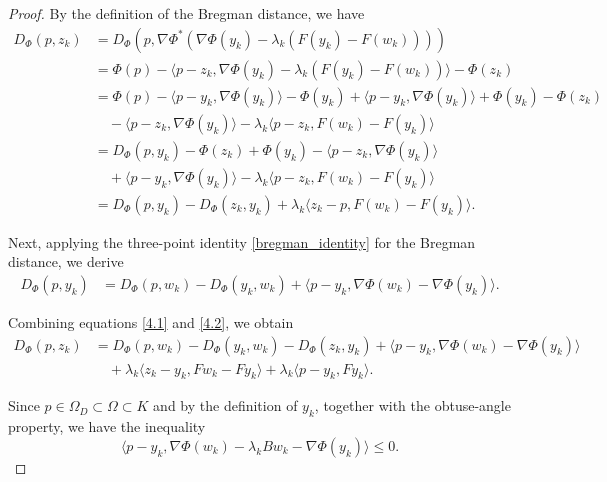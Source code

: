 \documentclass[hidelinks,11 pt]{article}
\numberwithin{equation}{section}
\theoremstyle{definition}  %
\numberwithin{equation}{section}
\numberwithin{theorem}{section}
\begin{document}
\begin{proof}
By the definition of the Bregman distance, we have
\begin{align*}
    D_{\Phi}(p, z_k) 
    &= D_{\Phi}\left(p, \nabla \Phi^*\left(\nabla \Phi(y_k) - \lambda_k (F(y_k) - F( w_k))\right)\right) \\
    &= \Phi(p) - \langle p - z_k, \nabla \Phi(y_k) - \lambda_k (F(y_k) - F(w_k)) \rangle - \Phi(z_k) \\
    &= \Phi(p) - \langle p - y_k, \nabla \Phi(y_k) \rangle - \Phi(y_k) + \langle p - y_k, \nabla \Phi(y_k) \rangle + \Phi(y_k) - \Phi(z_k) \\
    &\quad - \langle p - z_k, \nabla \Phi(y_k) \rangle - \lambda_k \langle p - z_k, F(w_k) - F( y_k) \rangle \\
    &= D_{\Phi}(p, y_k) - \Phi(z_k) + \Phi(y_k) - \langle p - z_k, \nabla \Phi(y_k) \rangle \\
    &\quad + \langle p - y_k, \nabla \Phi(y_k) \rangle - \lambda_k \langle p - z_k, F(w_k) - F( y_k) \rangle \\
    &= D_{\Phi}(p, y_k) - D_{\Phi}(z_k, y_k) + \lambda_k \langle z_k - p, F(w_k) - F(y_k) \rangle. \tag{4.1}\label{4.1}
\end{align*}

Next, applying the three-point identity \eqref{bregman_identity} for the Bregman distance, we derive
\begin{align*}
    D_{\Phi}(p, y_k) 
    &= D_{\Phi}(p, w_k) - D_{\Phi}(y_k, w_k) + \langle p - y_k, \nabla \Phi(w_k) - \nabla \Phi(y_k) \rangle. \tag{4.2}\label{4.2}
\end{align*}

Combining equations \eqref{4.1} and \eqref{4.2}, we obtain
\begin{align*}
    D_{\Phi}(p, z_k) 
    &= D_{\Phi}(p, w_k) - D_{\Phi}(y_k, w_k) - D_{\Phi}(z_k, y_k) 
    + \langle p - y_k, \nabla \Phi(w_k) - \nabla \Phi(y_k) \rangle \\
    &\quad + \lambda_k \langle z_k - y_k, F w_k - F y_k \rangle + \lambda_k \langle p - y_k, F y_k \rangle. \tag{4.3}\label{4.3}
\end{align*}

Since \( p \in \Omega_D \subset \Omega \subset K \) and by the definition of \( y_k \), together with the obtuse-angle property, we have the inequality
\begin{equation*}
    \langle p - y_k, \nabla \Phi(w_k) - \lambda_k B w_k - \nabla \Phi(y_k) \rangle \leq 0. \tag{4.4}\label{4.4}
\end{equation*}


\end{proof}
\end{document}
